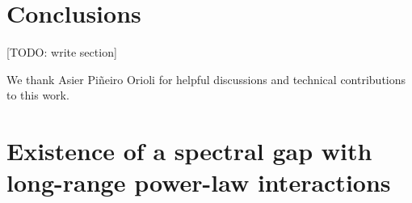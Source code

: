 \documentclass[nofootinbib,notitlepage,11pt]{revtex4-2}
\newcommand{\1}{\mathds{1}}
\newcommand{\red}[1]{{\color{red} #1}}
\begin{document}

\newpage

\section{Conclusions}
\label{sec:conclusions}


\red{[TODO: write section]}


\begin{acknowledgments}
  We thank Asier Pi\~neiro Orioli for helpful discussions and technical contributions to this work.
\end{acknowledgments}



\newpage
\appendix

\section{Existence of a spectral gap with long-range power-law
  interactions}
\label{sec:spectral_gap}
\end{document}

